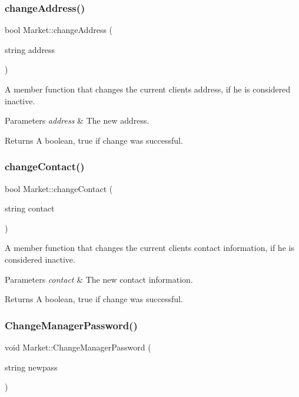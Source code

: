 \subsubsection{\texorpdfstring{change\+Address()}{changeAddress()}}
{\footnotesize\ttfamily bool Market\+::change\+Address (\begin{DoxyParamCaption}\item[{string}]{address }\end{DoxyParamCaption})}

A member function that changes the current client\textquotesingle{}s address, if he is considered inactive. 
\begin{DoxyParams}{Parameters}
{\em address} & The new address. \\
\hline
\end{DoxyParams}
\begin{DoxyReturn}{Returns}
A boolean, true if change was successful. 
\end{DoxyReturn}
\hypertarget{class_market_a3dd294fab22a4de9ee4d29dbb6808af8}{}\label{class_market_a3dd294fab22a4de9ee4d29dbb6808af8} 
\subsubsection{\texorpdfstring{change\+Contact()}{changeContact()}}
{\footnotesize\ttfamily bool Market\+::change\+Contact (\begin{DoxyParamCaption}\item[{string}]{contact }\end{DoxyParamCaption})}

A member function that changes the current client\textquotesingle{}s contact information, if he is considered inactive. 
\begin{DoxyParams}{Parameters}
{\em contact} & The new contact information. \\
\hline
\end{DoxyParams}
\begin{DoxyReturn}{Returns}
A boolean, true if change was successful. 
\end{DoxyReturn}
\hypertarget{class_market_adec18f71a55512b0ea152c06e95662f9}{}\label{class_market_adec18f71a55512b0ea152c06e95662f9} 
\subsubsection{\texorpdfstring{Change\+Manager\+Password()}{ChangeManagerPassword()}}
{\footnotesize\ttfamily void Market\+::\+Change\+Manager\+Password (\begin{DoxyParamCaption}\item[{string}]{newpass }\end{DoxyParamCaption})}

